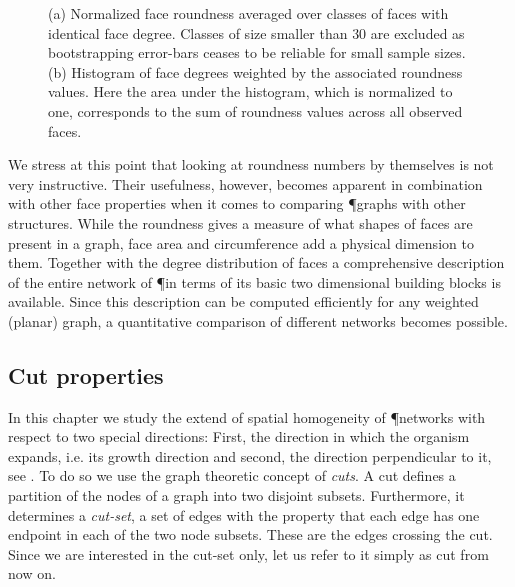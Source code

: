 		\begin{figure}
			\centering
			\qquad

			\caption[Average face roundness per face type.]{(a) Normalized face roundness averaged over classes of faces with identical face degree. Classes of size smaller than $30$ are excluded as bootstrapping error-bars ceases to be reliable for small sample sizes. (b) Histogram of face degrees weighted by the associated roundness values. Here the area under the histogram, which is normalized to one, corresponds to the sum of roundness values across all observed faces.}
		\end{figure}

		We stress at this point that looking at roundness numbers by themselves is not very instructive. Their usefulness, however, becomes apparent in combination with other face properties when it comes to comparing \P graphs with other structures. While the roundness gives a measure of what shapes of faces are present in a graph, face area and circumference add a physical dimension to them. Together with the degree distribution of faces a comprehensive description of the entire network of \P in terms of its basic two dimensional building blocks is available. Since this description can be computed efficiently for any weighted (planar) graph, a quantitative comparison of different networks becomes possible.

	\subsection{Cut properties}

		In this chapter we study the extend of spatial homogeneity of \P networks with respect to two special directions: First, the direction in which the organism expands, i.e. its growth direction and second, the direction perpendicular to it, see . To do so we use the graph theoretic concept of \emph{cuts}. A cut defines a partition of the nodes of a graph into two disjoint subsets. Furthermore, it determines a \emph{cut-set}, a set of edges with the property that each edge has one endpoint in each of the two node subsets. These are the edges crossing the cut. Since we are interested in the cut-set only, let us refer to it simply as cut from now on. 

